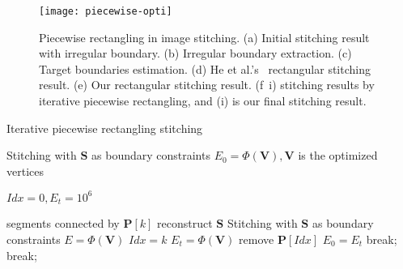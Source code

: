 \documentclass[10pt,journal,compsoc]{IEEEtran}
\begin{document}
\begin{figure*}
  \centering
  \texttt{[image: piecewise-opti]}
  \caption{Piecewise rectangling in image stitching. (a) Initial stitching result with irregular boundary. (b) Irregular boundary extraction. (c) Target boundaries estimation.
  (d) He et al.'s~\cite{journals/tog/HeC013} rectangular stitching result. (e) Our rectangular stitching result. (f~i) stitching results by iterative piecewise rectangling, and (i) is our final stitching result. } \label{fig:piecewise-process}
\end{figure*}


\begin{algorithm}
 \label{alg:piecewise_rectangling}
     \caption{Iterative piecewise rectangling stitching}
      Stitching with $\textbf{S}$ as boundary constraints\;
      $E_0 = \Phi(\textbf{V}), \textbf{V}$ is the optimized vertices\;
      {
           $Idx=0, E_t=10^6$\;

           {
                  segments connected by $\textbf{P}[k]$\;
                  reconstruct $\textbf{S}$\;
                  Stitching with $\textbf{S}$ as boundary constraints\;
                  $E = \Phi(\textbf{V})$\;
                  {
                       $Idx=k$\;
                        $E_t = \Phi(\textbf{V})$\;
                  }
           }
           {
                remove $\textbf{P}[Idx]$\;
                $E_0=E_t$\;
           }
           \Else
           {
                break;
           }
           {
               break;
           }
      }
\end{algorithm}
\end{document}
